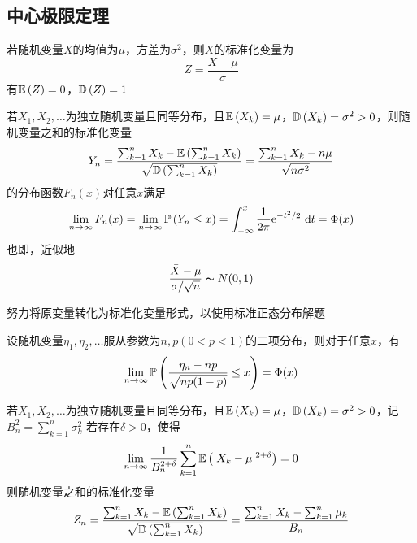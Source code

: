\subsection{中心极限定理}
\begin{definition}[标准化变量]
若随机变量$X$的均值为$\mu$，方差为$\sigma^2$，则$X$的标准化变量为
\[Z=\dfrac{X-\mu}{\sigma}\]
有$\mathbb{E}\left(Z\right)=0$，$\mathbb{D}\left(Z\right)=1$
\end{definition}
\begin{theorem}[独立同分布的中心极限定理]
若$X_1,X_2,\ldots$为独立随机变量且同等分布，且$\mathbb{E}\left(X_k\right)=\mu$，$\mathbb{D}\left(X_k\right)=\sigma^2>0$，则随机变量之和的标准化变量
\[Y_n=\frac{\sum_{k=1}^nX_k-\mathbb{E}\left(\sum_{k=1}^nX_k\right)}{\sqrt{\mathbb{D}\left(\sum_{k=1}^nX_k\right)}}=\frac{\sum_{k=1}^nX_k-n\mu}{\sqrt{n\sigma^2}}\]
的分布函数$F_n(x)$对任意$x$满足
\[\lim_{n\to\infty}F_n(x)=\lim_{n\to\infty}\mathbb{P}\left(Y_n\leq x\right)=\displaystyle\int_{-\infty}^{x}{\frac{1}{2\pi}\mathrm{e}^{-t^2/2}}\,\,\mathrm{d} t=\Phi(x)\]
也即，近似地
\[\frac{\bar{X}-\mu}{\sigma/\sqrt{n}}\thicksim N(0,1)\]
\end{theorem}
努力将原变量转化为标准化变量形式，以使用标准正态分布解题
\begin{corollary2}
设随机变量$\eta_1,\eta_2,\ldots$服从参数为$n,p(0<p<1)$的二项分布，则对于任意$x$，有
\[\lim_{n\to\infty}\mathbb{P}\left(\frac{\eta_n-np}{\sqrt{np(1-p)}}\leq x\right)=\Phi(x)\]
\end{corollary2}
\begin{theorem}
若$X_1,X_2,\ldots$为独立随机变量且同等分布，且$\mathbb{E}\left(X_k\right)=\mu$，$\mathbb{D}\left(X_k\right)=\sigma^2>0$，记$B_n^2=\sum_{k=1}^n\sigma_k^2$
若存在$\delta>0$，使得
\[\lim_{n\to\infty}\frac{1}{B_n^{2+\delta}}\sum_{k=1}^n\mathbb{E}\left(|X_k-\mu|^{2+\delta}\right)=0\]
则随机变量之和的标准化变量
\[Z_n=\frac{\sum_{k=1}^nX_k-\mathbb{E}\left(\sum_{k=1}^nX_k\right)}{\sqrt{\mathbb{D}\left(\sum_{k=1}^nX_k\right)}}=\frac{\sum_{k=1}^nX_k-\sum_{k=1}^n\mu_k}{B_n}\]
\end{theorem}